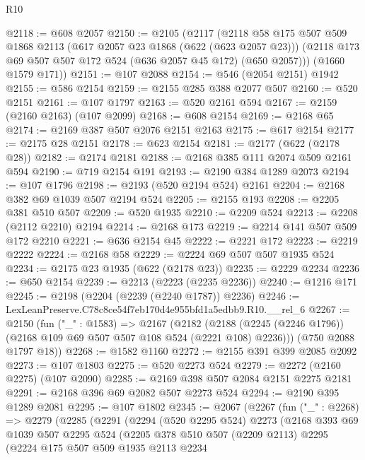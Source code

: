 \begin{lexlean}{R10}
\begin{coremodule}
@2118 := @608 @2057
@2150 := @2105
    (@2117
      (@2118
        @58
        @175
        @507
        @509
        @1868
        @2113
        (@617 @2057 @23 @1868 (@622 (@623 @2057 @23)))
        (@2118 @173 @69 @507 @507 @172 @524 (@636 @2057 @45 @172) (@650 @2057)))
      (@1660 @1579 @171))
@2151 := @107 @2088
@2154 := @546 (@2054 @2151) @1942
@2155 := @586 @2154
@2159 := @2155 @285 @388 @2077 @507
@2160 := @520 @2151
@2161 := @107 @1797
@2163 := @520 @2161 @594
@2167 := @2159 (@2160 @2163) (@107 @2099)
@2168 := @608 @2154
@2169 := @2168 @65
@2174 := @2169 @387 @507 @2076 @2151 @2163
@2175 := @617 @2154
@2177 := @2175 @28 @2151
@2178 := @623 @2154
@2181 := @2177 (@622 (@2178 @28))
@2182 := @2174 @2181
@2188 := @2168 @385 @111 @2074 @509 @2161 @594
@2190 := @719 @2154 @191
@2193 := @2190 @384 @1289 @2073
@2194 := @107 @1796
@2198 := @2193 (@520 @2194 @524) @2161
@2204 := @2168 @382 @69 @1039 @507 @2194 @524
@2205 := @2155 @193
@2208 := @2205 @381 @510 @507
@2209 := @520 @1935
@2210 := @2209 @524
@2213 := @2208 (@2112 @2210) @2194
@2214 := @2168 @173
@2219 := @2214 @141 @507 @509 @172 @2210
@2221 := @636 @2154 @45
@2222 := @2221 @172
@2223 := @2219 @2222
@2224 := @2168 @58
@2229 := @2224 @69 @507 @507 @1935 @524
@2234 := @2175 @23 @1935 (@622 (@2178 @23))
@2235 := @2229 @2234
@2236 := @650 @2154
@2239 := @2213 (@2223 (@2235 @2236))
@2240 := @1216 @171
@2245 := @2198 (@2204 (@2239 (@2240 @1787)) @2236)
@2246 := LexLeanPreserve.C78c8ce54f7eb170d4e955bfd1a5edbb9.R10.__rel_6
@2267 := @2150
    (fun ("_" : @1583) =>
    @2167
      (@2182 (@2188 (@2245 (@2246 @1796)) (@2168 @109 @69 @507 @507 @108 @524 (@2221 @108) @2236)))
      (@750 @2088 @1797 @18))
@2268 := @1582 @1160
@2272 := @2155 @391 @399 @2085 @2092
@2273 := @107 @1803
@2275 := @520 @2273 @524
@2279 := @2272 (@2160 @2275) (@107 @2090)
@2285 := @2169 @398 @507 @2084 @2151 @2275 @2181
@2291 := @2168 @396 @69 @2082 @507 @2273 @524
@2294 := @2190 @395 @1289 @2081
@2295 := @107 @1802
@2345 := @2067
    (@2267
      (fun ("_" : @2268) =>
      @2279
        (@2285
          (@2291
            (@2294
              (@520 @2295 @524)
              @2273
              (@2168
                @393
                @69
                @1039
                @507
                @2295
                @524
                (@2205
                  @378
                  @510
                  @507
                  (@2209 @2113)
                  @2295
                  (@2224
                    @175
                    @507
                    @509
                    @1935
                    @2113
                    @2234

\end{coremodule}
\end{lexlean}

